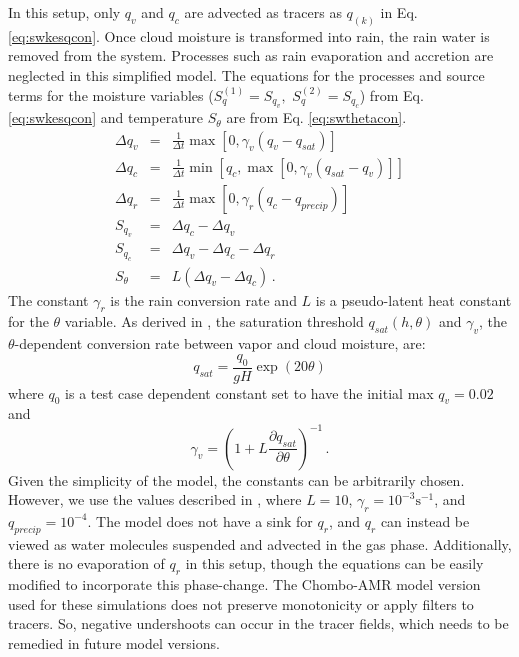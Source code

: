 In this setup, only $q_v$ and $q_c$ are advected as 
tracers as $q_{(k)}$ in Eq. \ref{eq:swkesqcon}. Once cloud moisture is transformed 
into rain, the rain water is removed from the system. Processes such as rain evaporation and 
accretion are neglected in this simplified model. The equations for 
the processes and source terms for the moisture variables 
($S_q^{(1)}=S_{q_v}, \,\, S_q^{(2)}=S_{q_c}$) from Eq. \ref{eq:swkesqcon} 
and temperature $S_\theta$ are from Eq. \ref{eq:swthetacon}.
   \begin{eqnarray}
     \Delta q_v & = & \frac{1}{\Delta t}\max \left[ 0, \gamma_v\left(q_v - q_{sat}\right)\right]\\
     \Delta q_c & = & \frac{1}{\Delta t}\min\left[ q_c, \max \left[0, \gamma_v\left(q_{sat} - q_v \right)\right]\right] \\
     \Delta q_r & = & \frac{1}{\Delta t}\max \left[ 0, \gamma_r\left(q_c - q_{precip}\right)\right]\\
     S_{q_v} & = & \Delta q_c - \Delta q_v \\
     S_{q_c} & = & \Delta q_v - \Delta q_c - \Delta q_r \\
     S_{\theta} & = & L\left(\Delta q_v - \Delta q_c\right)\,.
   \end{eqnarray}
The constant $\gamma_r$ is the rain conversion rate and $L$ is a pseudo-latent heat 
constant for the $\theta$ variable. As derived in \cite{zerroukat2015moist}, the 
 saturation threshold $q_{sat}(h, \theta)$ and $\gamma_v$, the $\theta$-dependent 
conversion rate between vapor and cloud moisture, are:
   \begin{equation}
     \label{eq:qsat} q_{sat} = \frac{q_0}{gH}\exp{(20\theta)}
   \end{equation}
   where $q_0$ is a test case dependent constant set to have the initial max $q_v=0.02$ and
   \begin{equation}
     \label{eq:gammav} \gamma_v = \left(1 + L \frac{\partial q_{sat}}{\partial \theta}\right)^{-1} \, .
   \end{equation}
Given the simplicity of the model, the constants can be arbitrarily chosen. 
However, we use the values described in \cite{zerroukat2015moist}, 
where $L=10$, $\gamma_r = 10^{-3} \mathrm{ s}^{-1}$, and $q_{precip} = 10^{-4}$. 
The model does not have a sink for $q_r$, and $q_r$ can instead be viewed 
as water molecules suspended and advected in the gas phase. Additionally, there
is no evaporation of $q_r$ in this setup, though the equations can be 
easily modified to incorporate this phase-change. 
The Chombo-AMR model version used for these simulations does
not preserve monotonicity or apply filters to tracers. So, 
negative undershoots can occur in the tracer fields, which needs to
be remedied in future model versions.
  
